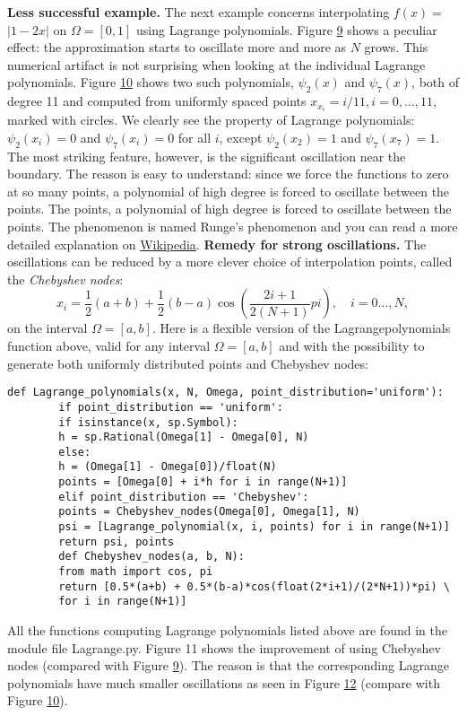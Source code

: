 \documentclass[../main.tex]{subfiles}
\begin{document}
	\noindent \textbf{Less successful example.} The next example concerns interpolating $f(x)=$ $|1-2 x|$ on $\Omega=[0,1]$ using Lagrange polynomials. Figure \hyperref[fig:img_9]{9} shows a peculiar effect: the approximation starts to oscillate more and more as $N$ grows. This numerical artifact is not surprising when looking at the individual Lagrange polynomials. Figure \hyperref[fig:img_10]{10} shows two such polynomials, $\psi_{2}(x)$ and $\psi_{7}(x)$, both of degree 11 and computed from uniformly spaced points $x_{x_{i}}=i / 11, i=0, \ldots, 11$, marked with circles. We clearly see the property of Lagrange polynomials: $\psi_{2}\left(x_{i}\right)=0$ and $\psi_{7}\left(x_{i}\right)=0$ for all $i$, except $\psi_{2}\left(x_{2}\right)=1$ and $\psi_{7}\left(x_{7}\right)=1$. The most striking feature, however, is the significant oscillation near the boundary. The reason is easy to understand: since we force the functions to zero at so many points, a polynomial of high degree is forced to oscillate between the points. The points, a polynomial of high degree is forced to oscillate between the points. The phenomenon is named Runge's phenomenon and you can read a more detailed explanation on \href{https://en.wikipedia.org/wiki/Runge%27s_phenomenon}{Wikipedia}.
	\bigbreak
	\noindent \textbf{Remedy for strong oscillations.} The oscillations can be reduced by a more clever choice of interpolation points, called the \textit{Chebyshev nodes}:
	\begin{equation}\label{eqa50}
		x_{i}=\frac{1}{2}(a+b)+\frac{1}{2}(b-a) \cos \left(\frac{2 i+1}{2(N+1)} p i\right), \quad i=0 \ldots, N,
	\end{equation}
	on the interval $\Omega=[a, b]$. Here is a flexible version of the Lagrange\textunderscore polynomials function above, valid for any interval $\Omega=[a, b]$ and with the possibility to generate both uniformly distributed points and Chebyshev nodes:
	\begin{lstlisting}[numbers=none]
		def Lagrange_polynomials(x, N, Omega, point_distribution='uniform'):
		if point_distribution == 'uniform':
		if isinstance(x, sp.Symbol):
		h = sp.Rational(Omega[1] - Omega[0], N)
		else:
		h = (Omega[1] - Omega[0])/float(N)
		points = [Omega[0] + i*h for i in range(N+1)]
		elif point_distribution == 'Chebyshev':
		points = Chebyshev_nodes(Omega[0], Omega[1], N)
		psi = [Lagrange_polynomial(x, i, points) for i in range(N+1)]
		return psi, points
		def Chebyshev_nodes(a, b, N):
		from math import cos, pi
		return [0.5*(a+b) + 0.5*(b-a)*cos(float(2*i+1)/(2*N+1))*pi) \
		for i in range(N+1)]
	\end{lstlisting}
	All the functions computing Lagrange polynomials listed above are found in the module file Lagrange.py. Figure 11 shows the improvement of using Chebyshev nodes (compared with Figure \hyperref[fig:img_9]{9}). The reason is that the corresponding Lagrange polynomials have much smaller oscillations as seen in Figure \hyperref[fig:img_12]{12} (compare with Figure \hyperref[fig:img_10]{10}).
	
\end{document}
